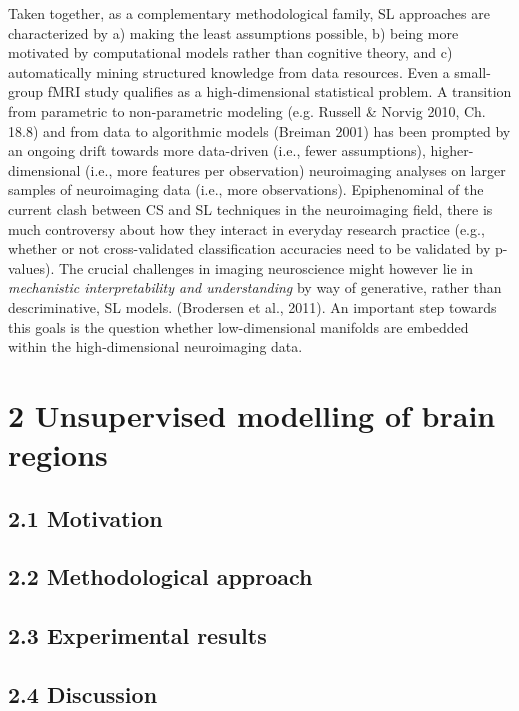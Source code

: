 \documentclass[authoryear,review,3p]{elsarticle}
\begin{document}
Taken together,
as a complementary methodological family,
SL approaches are characterized by
a) making the least assumptions possible,
b) being more motivated by computational models rather than cognitive theory,
and c) automatically mining structured knowledge from data resources.
Even a
small-group fMRI study qualifies as a high-dimensional statistical problem.
A transition from parametric to non-parametric modeling
(e.g. Russell \& Norvig 2010, Ch. 18.8)
and
from data to algorithmic models (Breiman 2001)
has been prompted by an ongoing
drift towards more data-driven (i.e., fewer assumptions),
higher-dimensional (i.e., more features per observation) neuroimaging analyses
on larger samples of neuroimaging data (i.e., more observations).
%
Epiphenominal of the current clash between
CS and SL techniques in the neuroimaging field,
there is much
controversy about how they interact in everyday research practice
(e.g., whether or not cross-validated classification accuracies need to be
validated by p-values).
%
The crucial challenges in imaging neuroscience
might however lie in
\textit{mechanistic interpretability and understanding}
by way of generative, rather than descriminative, SL models.
(Brodersen et al., 2011).
An important step towards this goals is the question
whether
low-dimensional manifolds are
embedded within the high-dimensional neuroimaging data.


\section*{2 Unsupervised modelling of brain regions}

\subsection*{2.1 Motivation}
\subsection*{2.2 Methodological approach}
\subsection*{2.3 Experimental results}
\subsection*{2.4 Discussion}
\end{document}
